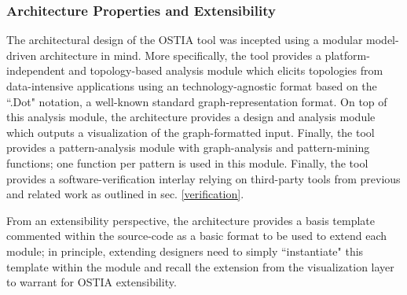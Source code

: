 \documentclass[smallextended]{svjour3}       %
\begin{document}
{\color{blue}
\subsubsection{Architecture Properties and Extensibility}

The architectural design of the OSTIA tool was incepted using a modular model-driven architecture \cite{mda} in mind. More specifically, the tool provides a platform-independent and topology-based analysis module which elicits topologies from data-intensive applications using an technology-agnostic format based on the ``.Dot" notation, a well-known standard graph-representation format. On top of this analysis module, the architecture provides a design and analysis module which outputs a visualization of the graph-formatted input. Finally, the tool provides a pattern-analysis module with graph-analysis and pattern-mining functions; one function per pattern is used in this module. Finally, the tool provides a software-verification interlay relying on third-party tools from previous and related work as outlined in sec. \ref{verification}.

From an extensibility perspective, the architecture provides a basis template commented within the source-code as a basic format to be used to extend each module; in principle, extending designers need to simply ``instantiate" this template within the module and recall the extension from the visualization layer to warrant for OSTIA extensibility.

}
\end{document}
